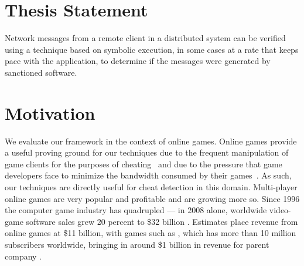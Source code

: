 

\section{Thesis Statement}
Network messages from a remote client in a distributed system can be
verified using a technique based on symbolic execution, in some cases
at a rate that keeps pace with the application, to determine if the
messages were generated by sanctioned software.

\section{Motivation}

We evaluate our framework in the context of online games.  Online
games provide a useful proving ground for our techniques due to the
frequent manipulation of game clients for the purposes of
cheating~\cite{yan05:classification,lyhyaoui05:categorization,webb08:survey}
and due to the pressure that game developers face to minimize the
bandwidth consumed by their games~\cite{mulligan03:guide}.  As such,
our techniques are directly useful for cheat detection in this domain.
Multi-player online games are very popular and profitable and are
growing more so.  Since 1996 the computer game industry has quadrupled
--- in 2008 alone, worldwide video-game software sales grew 20 percent
to \$32 billion \cite{videobusiness09:sales}.  Estimates place revenue
from online games at \$11 billion, with games such as \wow, which has
more than 10 million subscribers worldwide, bringing in around \$1
billion in revenue for parent company \blizzard
\cite{gamasutra08:wow,gamasutra09:onlinegames}.

